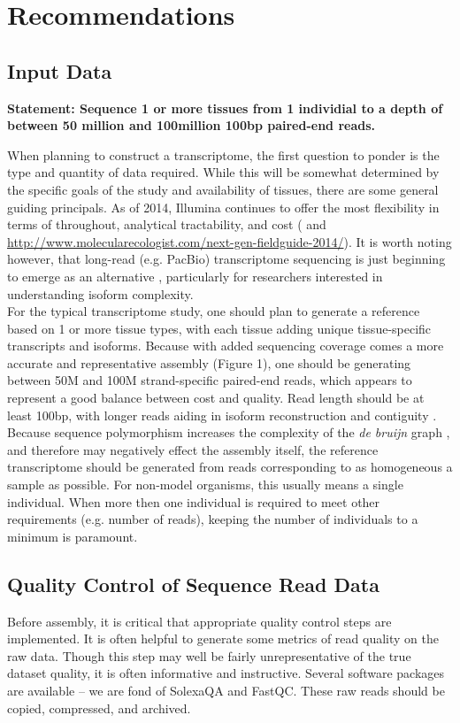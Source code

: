 \section*{Recommendations}

\subsection{Input Data}
\begin{center}
\bf{Statement: Sequence 1 or more tissues from 1 individial to a depth of between 50 million and 100million 100bp paired-end reads.}
\end{center}
When planning to construct a transcriptome, the first question to ponder is the type and quantity of data required. While this will be somewhat determined by the specific goals of the study and availability of tissues, there are some general guiding principals. As of 2014, Illumina continues to offer the most flexibility in terms of throughout, analytical tractability, and cost (\citep{Glenn:2011gy} and \url{http://www.molecularecologist.com/next-gen-fieldguide-2014/}). It is worth noting however, that long-read (e.g. PacBio) transcriptome sequencing is just beginning to emerge as an alternative \citep{Au:2013hp}, particularly for researchers interested in understanding isoform complexity. \\

For the typical transcriptome study, one should plan to generate a reference based on 1 or more tissue types, with each tissue adding unique tissue-specific transcripts and isoforms. Because with added sequencing coverage comes a more accurate and representative assembly (Figure 1), one should be generating between 50M and 100M strand-specific paired-end reads, which appears to represent a good balance between cost and quality. Read length should be at least 100bp, with longer reads aiding in isoform reconstruction and contiguity \citep{Garber:2011gp}. Because sequence polymorphism increases the complexity of the \textit{de bruijn} graph \citep{Iqbal:2012fx,Paszkiewicz:2010dla}, and therefore may negatively effect the assembly itself, the reference transcriptome should be generated from reads corresponding to as homogeneous a sample as possible. For non-model organisms, this usually means a single individual. When more then one individual is required to meet other requirements (e.g. number of reads), keeping the number of individuals to a minimum is paramount. \\

\subsection{Quality Control of Sequence Read Data}
Before assembly, it is critical that appropriate quality control steps are implemented. It is often helpful to generate some metrics of read quality on the raw data. Though this step may well be fairly unrepresentative of the true dataset quality, it is often informative and instructive. Several software packages are available -- we are fond of SolexaQA and FastQC. These raw reads should be copied, compressed, and archived. \\

